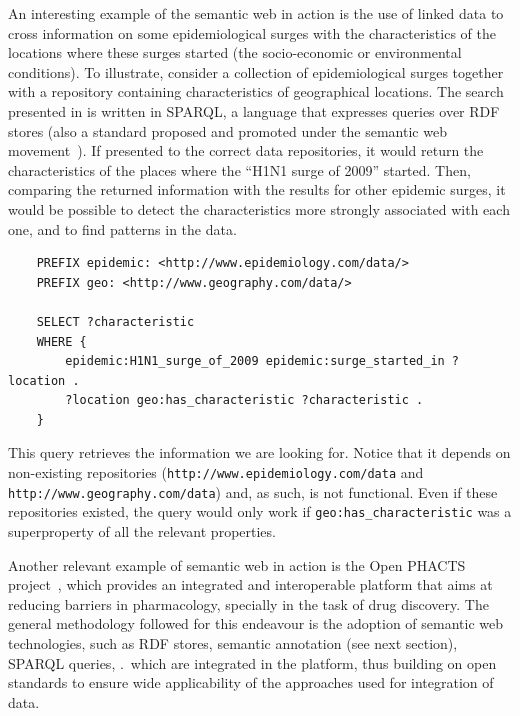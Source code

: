 An interesting example of the semantic web in action is the use of linked data to cross information on some epidemiological surges with the characteristics of the locations where these surges started (\eg the socio-economic or environmental conditions). To illustrate, consider a collection of epidemiological surges together with a repository containing characteristics of geographical locations. The search presented in  is written in SPARQL, a language that expresses queries over RDF stores (also a standard proposed and promoted under the semantic web movement~\citep{Harris2013}). If presented to the correct data repositories, it would return the characteristics of the places where the ``H1N1 surge of 2009'' started. Then, comparing the returned information with the results for other epidemic surges, it would be possible to detect the characteristics more strongly associated with each one, and to find patterns in the data.

\begin{listing}[t]
\centering
\begin{verbatim}
    PREFIX epidemic: <http://www.epidemiology.com/data/>
    PREFIX geo: <http://www.geography.com/data/>
    
    SELECT ?characteristic
    WHERE {
        epidemic:H1N1_surge_of_2009 epidemic:surge_started_in ?location .
        ?location geo:has_characteristic ?characteristic .
    }
\end{verbatim}
\caption[Finding the characteristics of the starting place of an epidemic with SPARQL]{This query retrieves the information we are looking for. Notice that it depends on non-existing repositories (\nolinkurl{http://www.epidemiology.com/data} and \nolinkurl{http://www.geography.com/data}) and, as such, is not functional. Even if these repositories existed, the query would only work if \texttt{geo:has_characteristic} was a superproperty of all the relevant properties.}
\label{lst:sparql}
\end{listing}

Another relevant example of semantic web in action is the Open PHACTS project~\citep{Williams2012}, which provides an integrated and interoperable platform that aims at reducing barriers in pharmacology, specially in the task of drug discovery. The general methodology followed for this endeavour is the adoption of semantic web technologies, such as RDF stores, semantic annotation (see next section), SPARQL queries, \etc.\ which are integrated in the platform, thus building on open standards to ensure wide applicability of the approaches used for integration of data.


